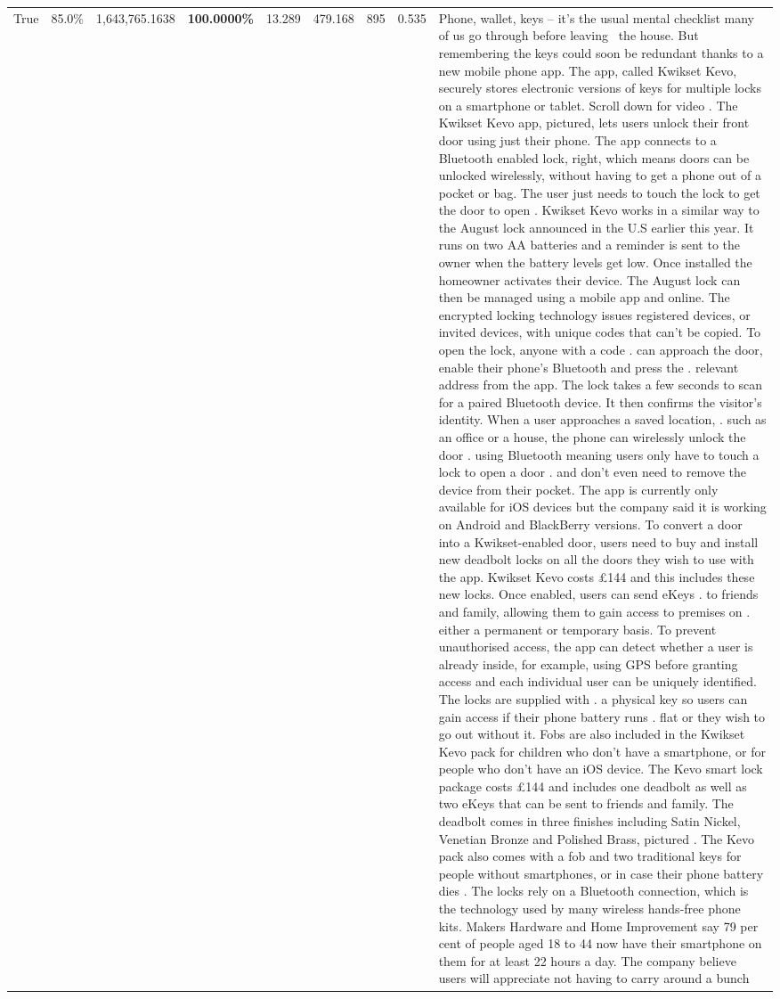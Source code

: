 \begin{table}[H]
\begin{tabular}{lllrlllll}
True & 85.0\% & 1,643,765.1638 & \bfseries \color{red} 100.0000\% & 13.289 & 479.168 & 895 & 0.535 & Phone, wallet, keys – it’s the usual mental checklist many of us go through before leaving  the house. But remembering the keys could soon be redundant thanks to a new mobile phone app. The app, called Kwikset Kevo, securely stores electronic versions of keys for multiple locks on a smartphone or tablet. Scroll down for video . The Kwikset Kevo app, pictured, lets users unlock their front door using just their phone. The app connects to a Bluetooth enabled lock, right, which means doors can be unlocked wirelessly, without having to get a phone out of a pocket or bag. The user just needs to touch the lock to get the door to open . Kwikset Kevo works in a similar way to the August lock announced in the U.S earlier this year. It runs on two AA batteries and a reminder is sent to the owner when the battery levels get low. Once installed the homeowner activates their device. The August lock can then be managed using a mobile app and online. The encrypted locking technology issues registered devices, or invited devices, with unique codes that can't be copied. To open the lock, anyone with a code . can approach the door, enable their phone's Bluetooth and press the . relevant address from the app. The lock takes a few seconds to scan for a paired Bluetooth device. It then confirms the visitor's identity. When a user approaches a saved location, . such as an office or a house, the phone can wirelessly unlock the door . using Bluetooth meaning users only have to touch a lock to open a door . and don't even need to remove the device from their pocket. The app is currently only available for iOS devices but the company said it is working on Android and BlackBerry versions. To convert a door into a Kwikset-enabled door, users need to buy and install new deadbolt locks on all the doors they wish to use with the app. Kwikset Kevo costs £144 and this includes these new locks. Once enabled, users can send eKeys . to friends and family, allowing them to gain access to premises on . either a permanent or temporary basis. To prevent unauthorised access, the app can detect whether a user is already inside, for example, using GPS before granting access and each individual user can be uniquely identified. The locks are supplied with . a physical key so users can gain access if their phone battery runs . flat or they wish to go out without it. Fobs are also included in the Kwikset Kevo pack for children who don't have a smartphone, or for people who don't have an iOS device. The Kevo smart lock package costs £144 and includes one deadbolt as well as two eKeys that can be sent to friends and family. The deadbolt comes in three finishes including Satin Nickel, Venetian Bronze and Polished Brass, pictured . The Kevo pack also comes with a fob and two traditional keys for people without smartphones, or in case their phone battery dies . The locks rely on a Bluetooth connection, which is the technology used by many wireless hands-free phone kits. Makers Hardware and Home Improvement say 79 per cent of people aged 18 to 44 now have their smartphone on them for at least 22 hours a day. The company believe users will appreciate not having to carry around a bunch 
\end{tabular}
\end{table}
